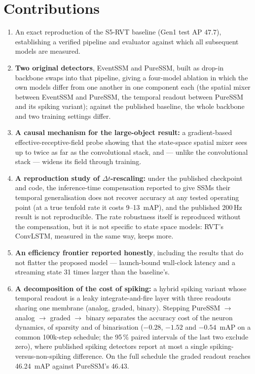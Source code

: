 \documentclass[11pt, a4paper]{report}
\begin{document}
\section{Contributions}
\label{sec:contributions}
\begin{enumerate}
  \item An exact reproduction of the S5-RVT baseline (Gen1 test AP $47.7$), establishing a verified
        pipeline and evaluator against which all subsequent models are measured.
  \item \textbf{Two original detectors}, EventSSM and PureSSM, built as drop-in backbone swaps into
        that pipeline, giving a four-model ablation in which the own models differ from one another in
        one component each (the spatial mixer between EventSSM and PureSSM, the temporal readout between
        PureSSM and its spiking variant); against the published baseline, the whole backbone and two
        training settings differ.
  \item \textbf{A causal mechanism for the large-object result:} a gradient-based effective-receptive-field
        probe showing that the state-space spatial mixer sees up to twice as far as the convolutional
        stack, and --- unlike the convolutional stack --- widens its field through training.
  \item \textbf{A reproduction study of $\Delta t$-rescaling:} under the published checkpoint and code,
        the inference-time compensation reported to give SSMs their temporal generalisation does not
        recover accuracy at any tested operating point (at a true tenfold rate it costs 9--13~mAP), and
        the published 200\,Hz result is not reproducible. The rate robustness itself is reproduced
        without the compensation, but it is not specific to state space models: RVT's ConvLSTM,
        measured in the same way, keeps more.
  \item \textbf{An efficiency frontier reported honestly}, including the results that do not flatter
        the proposed model --- launch-bound wall-clock latency and a streaming state 31 times larger
        than the baseline's.
  \item \textbf{A decomposition of the cost of spiking:} a hybrid spiking variant whose temporal readout is a
        leaky integrate-and-fire layer with three readouts sharing one membrane (analog, graded, binary).
        Stepping PureSSM $\rightarrow$ analog $\rightarrow$ graded $\rightarrow$ binary separates the
        accuracy cost of the neuron dynamics, of sparsity and of binarisation ($-0.28$, $-1.52$ and
        $-0.54$~mAP on a common 100k-step schedule; the 95\,\% paired intervals of the last two exclude zero),
        where published spiking
        detectors report at most a single spiking-versus-non-spiking difference. On the full schedule the
        graded readout reaches 46.24~mAP against PureSSM's 46.43.
\end{enumerate}
\end{document}
